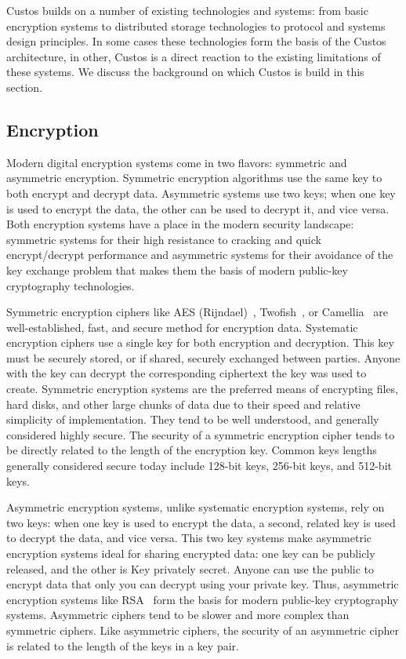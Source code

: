 Custos builds on a number of existing technologies and systems: from
basic encryption systems to distributed storage technologies to
protocol and systems design principles. In some cases these
technologies form the basis of the Custos architecture, in other,
Custos is a direct reaction to the existing limitations of these
systems. We discuss the background on which Custos is build in this
section.

\subsection{Encryption}

Modern digital encryption systems come in two flavors: symmetric and
asymmetric encryption. Symmetric encryption algorithms use the same
key to both encrypt and decrypt data. Asymmetric systems use two keys;
when one key is used to encrypt the data, the other can be used to
decrypt it, and vice versa. Both encryption systems have a place in
the modern security landscape: symmetric systems for their high
resistance to cracking and quick encrypt/decrypt performance and
asymmetric systems for their avoidance of the key exchange problem
that makes them the basis of modern public-key cryptography
technologies.

Symmetric encryption ciphers like AES (Rijndael)~\cite{Daemen1999},
Twofish~\cite{Schneier1998}, or Camellia~\cite{Matsui2004} are
well-established, fast, and secure method for encryption
data. Systematic encryption ciphers use a single key for both
encryption and decryption. This key must be securely stored, or if
shared, securely exchanged between parties. Anyone with the key can
decrypt the corresponding ciphertext the key was used to
create. Symmetric encryption systems are the preferred means of
encrypting files, hard disks, and other large chunks of data due to
their speed and relative simplicity of implementation. They tend to be
well understood, and generally considered highly secure. The security
of a symmetric encryption cipher tends to be directly related to the
length of the encryption key. Common keys lengths generally considered
secure today include 128-bit keys, 256-bit keys, and 512-bit keys.

Asymmetric encryption systems, unlike systematic encryption systems,
rely on two keys: when one key is used to encrypt the data, a second,
related key is used to decrypt the data, and vice versa. This two key
systems make asymmetric encryption systems ideal for sharing encrypted
data: one key can be publicly released, and the other is Key privately
secret. Anyone can use the public to encrypt data that only you can
decrypt using your private key. Thus, asymmetric encryption systems
like RSA~\cite{Rivest1978} form the basis for modern public-key
cryptography systems. Asymmetric ciphers tend to be slower and more
complex than symmetric ciphers. Like asymmetric ciphers, the security
of an asymmetric cipher is related to the length of the keys in a key
pair.


